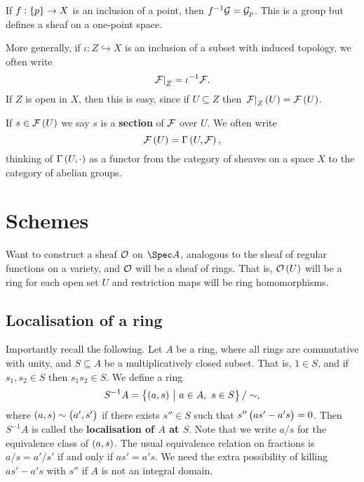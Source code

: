 \begin{example*}
If $ f : \cbr{p} \to X $ is an inclusion of a point, then $ f^{-1}\mathcal{G} = \mathcal{G}_p $. This is a group but defines a sheaf on a one-point space.
\end{example*}

More generally, if $ \iota : Z \hookrightarrow X $ is an inclusion of a subset with induced topology, we often write
$$ \left. \mathcal{F} \right|_Z = \iota^{-1}\mathcal{F}. $$
If $ Z $ is open in $ X $, then this is easy, since if $ U \subseteq Z $ then $ \eval{\FFF}_Z\br{U} = \FFF\br{U} $.

\begin{remark*}
If $ s \in \FFF\br{U} $ we say $ s $ is a \textbf{section} of $ \mathcal{F} $ over $ U $. We often write
$$ \FFF\br{U} = \Gamma\br{U, \FFF}, $$
thinking of $ \Gamma\br{U, \cdot} $ as a functor from the category of sheaves on a space $ X $ to the category of abelian groups.
\end{remark*}

\pagebreak

\section{Schemes}

Want to construct a sheaf $ \mathcal{O} $ on $ \Spec A $, analogous to the sheaf of regular functions on a variety, and $ \mathcal{O} $ will be a sheaf of rings. That is, $ \OOO\br{U} $ will be a ring for each open set $ U $ and restriction maps will be ring homomorphisms.

\subsection{Localisation of a ring}

Importantly recall the following. Let $ A $ be a ring, where all rings are commutative with unity, and $ S \subseteq A $ be a multiplicatively closed subset. That is, $ 1 \in S $, and if $ s_1, s_2 \in S $ then $ s_1s_2 \in S $. We define a ring
$$ S^{-1}A = \cbr{\br{a, s} \st a \in A, \ s \in S} / \sim, $$
where $ \br{a, s} \sim \br{a', s'} $ if there exists $ s'' \in S $ such that $ s''\br{as' - a's} = 0 $. Then $ S^{-1}A $ is called the \textbf{localisation of $ A $ at $ S $}. Note that we write $ a / s $ for the equivalence class of $ \br{a, s} $. The usual equivalence relation on fractions is $ a / s = a' / s' $ if and only if $ as' = a's $. We need the extra possibility of killing $ as' - a's $ with $ s'' $ if $ A $ is not an integral domain.

